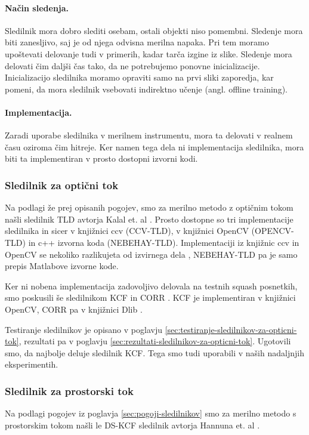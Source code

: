 \paragraph{Način sledenja.} Sledilnik mora dobro slediti osebam, ostali objekti niso pomembni. Sledenje mora biti zanesljivo, saj je od njega odvisna merilna napaka. Pri tem moramo upoštevati delovanje tudi v primerih, kadar tarča izgine iz slike. Sledenje mora delovati čim daljši čas tako, da ne potrebujemo ponovne inicializacije. Inicializacijo sledilnika moramo opraviti samo na prvi sliki zaporedja, kar pomeni, da mora sledilnik vsebovati indirektno učenje (angl. offline training).

\paragraph{Implementacija.} Zaradi uporabe sledilnika v merilnem instrumentu, mora ta delovati v realnem času oziroma čim hitreje. Ker namen tega dela ni implementacija sledilnika, mora biti ta implementiran v prosto dostopni izvorni kodi. 


\subsubsection{Sledilnik za optični tok}
Na podlagi že prej opisanih pogojev, smo za merilno metodo z optičnim tokom našli sledilnik TLD avtorja Kalal et. al \cite{kalal2012tracking}. Prosto dostopne so tri implementacije sledilnika in sicer v knjižnici ccv (CCV-TLD), v knjižnici OpenCV (OPENCV-TLD) in c++ izvorna koda (NEBEHAY-TLD). Implementaciji iz knjižnic ccv in OpenCV se nekoliko razlikujeta od izvirnega dela \cite{kalal2012tracking}, NEBEHAY-TLD pa je samo prepis Matlabove izvorne kode. 

Ker ni nobena implementacija zadovoljivo delovala na testnih squash posnetkih, smo poskusili še sledilnikom KCF \cite{danelljan2014adaptive} in CORR \cite{danelljan2014accurate}. KCF je implementiran v knjižnici OpenCV, CORR pa v knjižnici Dlib \cite{king2009dlib}.

Testiranje sledilnikov je opisano v poglavju \ref{sec:testiranje-sledilnikov-za-opticni-tok}, rezultati pa v poglavju \ref{sec:rezultati-sledilnikov-za-opticni-tok}. Ugotovili smo, da najbolje deluje sledilnik KCF. Tega smo tudi uporabili v naših nadaljnjih eksperimentih.

\subsubsection{Sledilnik za prostorski tok}
Na podlagi pogojev iz poglavja \ref{sec:pogoji-sledilnikov} smo za merilno metodo s prostorskim tokom našli le DS-KCF sledilnik avtorja Hannuna et. al \cite{hannuna2016ds}. 

